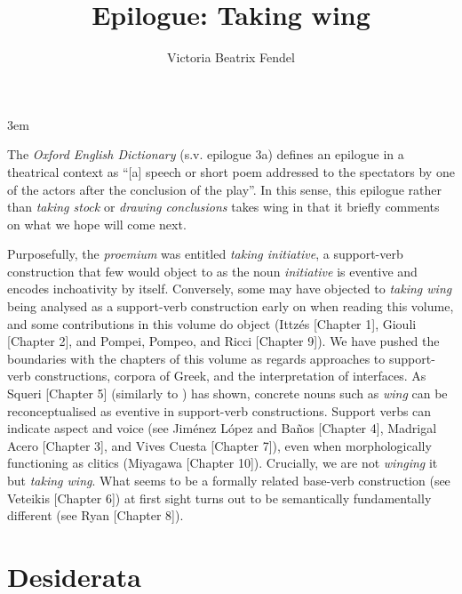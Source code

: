 \documentclass[output=paper,colorlinks,citecolor=brown]{langscibook}
\author{Victoria Beatrix Fendel\affiliation{University of Oxford}}
\title{Epilogue: Taking wing}
\begin{document}
\emergencystretch 3em
\maketitle

The \textit{Oxford English Dictionary} (s.v. epilogue 3a) defines an epilogue in a theatrical context as “[a] speech or short poem addressed to the spectators by one of the actors after the conclusion of the play”. In this sense, this epilogue rather than \textit{taking stock} or \textit{drawing conclusions} takes wing in that it briefly comments on what we hope will come next. 


Purposefully, the \textit{proemium} was entitled \textit{taking initiative}, a support-verb construction that few would object to as the noun \textit{initiative} is eventive and encodes inchoativity by itself. Conversely, some may have objected to \textit{taking wing} being analysed as a support-verb construction early on when reading this volume, and some contributions in this volume do object (Ittzés [Chapter 1], Giouli [Chapter 2], and Pompei, Pompeo, and Ricci [Chapter 9]). We have pushed the boundaries with the chapters of this volume as regards approaches to support-verb constructions, corpora of Greek, and the interpretation of interfaces. As Squeri [Chapter 5] (similarly to \citealt{radimskyNomsPredicatifsNoms2011}) has shown, concrete nouns such as \textit{wing} can be reconceptualised as eventive in support-verb constructions. Support verbs can indicate aspect and voice (see Jiménez López and Baños [Chapter 4], Madrigal Acero [Chapter 3], and Vives Cuesta [Chapter 7]), even when morphologically functioning as clitics (Miyagawa [Chapter 10]). Crucially, we are not \textit{winging} it but \textit{taking wing}. What seems to be a formally related base-verb construction (see Veteikis [Chapter 6]) at first sight turns out to be semantically fundamentally different (see Ryan [Chapter 8]).


\section{Desiderata}
\end{document}
